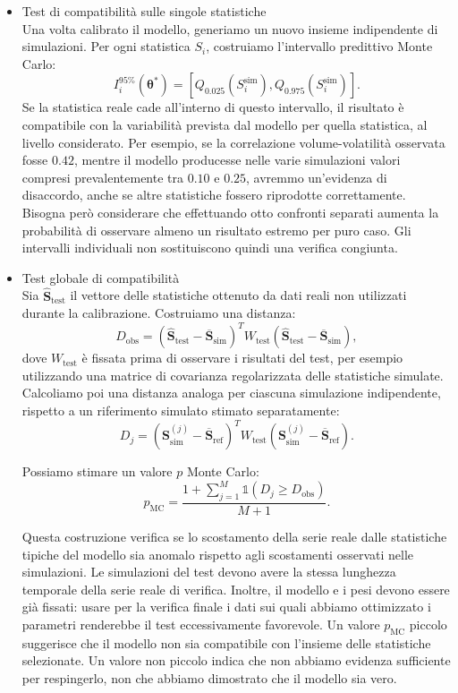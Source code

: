 \begin{itemize}
    \item Test di compatibilità sulle singole statistiche\\
    Una volta calibrato il modello, generiamo un nuovo insieme indipendente di simulazioni.
    Per ogni statistica \(S_i\), costruiamo l'intervallo predittivo Monte Carlo:
    \[
    I_i^{95\%}(\boldsymbol\theta^*)=
    \left[
    Q_{0.025}(S_i^{\mathrm{sim}}),
    Q_{0.975}(S_i^{\mathrm{sim}})
    \right].
    \]
    Se la statistica reale cade all'interno di questo intervallo, il risultato è compatibile con la variabilità prevista dal modello per quella 
    statistica, al livello considerato. Per esempio, se la correlazione volume-volatilità osservata fosse \(0.42\), mentre il modello producesse 
    nelle varie simulazioni valori compresi prevalentemente tra \(0.10\) e \(0.25\), avremmo un'evidenza di disaccordo, anche se altre statistiche fossero riprodotte correttamente.
    Bisogna però considerare che effettuando otto confronti separati aumenta la probabilità di osservare almeno un risultato estremo per puro caso. 
    Gli intervalli individuali non sostituiscono quindi una verifica congiunta.
    \item Test globale di compatibilità\\
    Sia \(\widehat{\mathbf S}_{\mathrm{test}}\) il vettore delle statistiche ottenuto da dati reali non utilizzati durante la calibrazione.
    Costruiamo una distanza:
    \[
    D_{\mathrm{obs}}=
    \left(
    \widehat{\mathbf S}_{\mathrm{test}}
    -\overline{\mathbf S}_{\mathrm{sim}}
    \right)^T
    W_{\mathrm{test}}
    \left(
    \widehat{\mathbf S}_{\mathrm{test}}
    -\overline{\mathbf S}_{\mathrm{sim}}
    \right),
    \]
    dove \(W_{\mathrm{test}}\) è fissata prima di osservare i risultati del test, per esempio utilizzando una matrice di covarianza regolarizzata delle statistiche simulate.
    Calcoliamo poi una distanza analoga per ciascuna simulazione indipendente, rispetto a un riferimento simulato stimato separatamente:
    \[
    D_j=
    \left(
    \mathbf S^{(j)}_{\mathrm{sim}}
    -\overline{\mathbf S}_{\mathrm{ref}}
    \right)^T
    W_{\mathrm{test}}
    \left(
    \mathbf S^{(j)}_{\mathrm{sim}}
    -\overline{\mathbf S}_{\mathrm{ref}}
    \right).
    \]

    Possiamo stimare un valore \(p\) Monte Carlo:
    \[
    p_{\mathrm{MC}}=
    \frac{
    1+\sum_{j=1}^{M}\mathbb{1}(D_j\geq D_{\mathrm{obs}})
    }{
    M+1
    }.
    \]

    Questa costruzione verifica se lo scostamento della serie reale dalle statistiche tipiche del modello sia anomalo rispetto agli scostamenti osservati nelle simulazioni.
    Le simulazioni del test devono avere la stessa lunghezza temporale della serie reale di verifica. Inoltre, il modello e i pesi devono essere già fissati: usare per la verifica finale i dati sui quali abbiamo ottimizzato i parametri renderebbe il test eccessivamente favorevole.
    Un valore \(p_{\mathrm{MC}}\) piccolo suggerisce che il modello non sia compatibile con l'insieme delle statistiche selezionate. Un valore non piccolo indica che non abbiamo evidenza sufficiente per respingerlo, non che abbiamo dimostrato che il modello sia vero.
\end{itemize}


